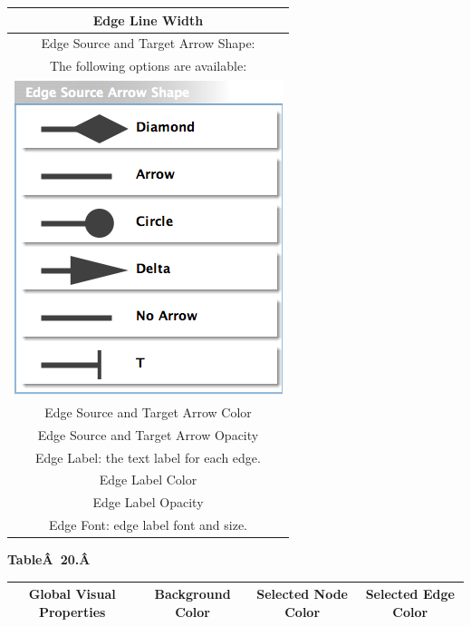 \begin{center}
\begin{tabular}{|c|}
\hline 
Edge Line Width\\ 
\hline 
Edge Source and Target Arrow Shape:\\
The following options are available: \\
\hline 
\includegraphics[width=.3\textwidth]{images/NewVizMapperArrowType.png} \\
\hline 
Edge Source and Target Arrow Color \\
\hline 
Edge Source and Target Arrow Opacity \\
\hline 
Edge Label: the text label for each edge. \\
\hline 
Edge Label Color \\
\hline 
Edge Label Opacity \\
\hline 
Edge Font: edge label font and size.\\
\hline 
\end{tabular}
\end{center}

\textbf{Table\^A 20.\^A }
\begin{tabular}{|c|c|c|c|}
\hline 
 \textbf{Global Visual Properties} & Background Color & Selected Node Color & Selected Edge Color \\
 \hline 
\end{tabular}


